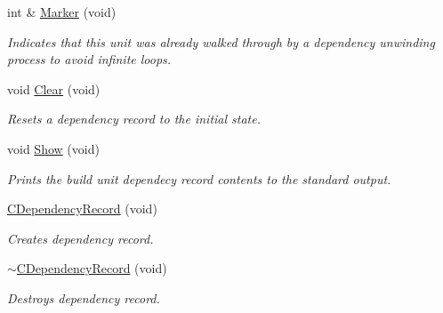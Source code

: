 \begin{DoxyCompactItemize}
int \& \hyperlink{classCDependencyRecord_a9e1e363a381f344201b3f952e2e838fc}{Marker} (void)
\begin{DoxyCompactList}\small\item\em Indicates that this unit was already walked through by a dependency unwinding process to avoid infinite loops. \end{DoxyCompactList}\item 
void \hyperlink{classCDependencyRecord_ac8150a2fea903df7ddfbf08bb4e5a08f}{Clear} (void)
\begin{DoxyCompactList}\small\item\em Resets a dependency record to the initial state. \end{DoxyCompactList}\item 
void \hyperlink{classCDependencyRecord_a7b79c94758324474032dfb940b61bc20}{Show} (void)
\begin{DoxyCompactList}\small\item\em Prints the build unit dependecy record contents to the standard output. \end{DoxyCompactList}\item 
\hyperlink{classCDependencyRecord_afef100de03173b459446a48bfeb87c03}{C\-Dependency\-Record} (void)
\begin{DoxyCompactList}\small\item\em Creates dependency record. \end{DoxyCompactList}\item 
\hyperlink{classCDependencyRecord_aaec37dc53c3bb3e299fd1334fe213a53}{$\sim$\-C\-Dependency\-Record} (void)
\begin{DoxyCompactList}\small\item\em Destroys dependency record. \end{DoxyCompactList}\end{DoxyCompactItemize}
